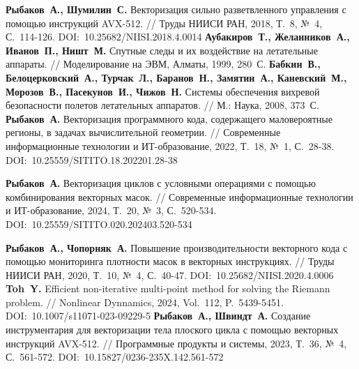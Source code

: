 \begin{thebibliography}{99}
\textbf{Рыбаков~А., Шумилин~С.} Векторизация сильно разветвленного управления с помощью инструкций AVX-512. // Труды НИИСИ РАН, 2018, Т.~8, №~4, С.~114-126. DOI:~10.25682/NIISI.2018.4.0014
\textbf{Аубакиров~Т., Желанников~А., Иванов~П., Ништ~М.} Спутные следы и их воздействие на летательные аппараты. // Моделирование на ЭВМ, Алматы, 1999, 280~С.
\textbf{Бабкин~В., Белоцерковский~А., Турчак~Л., Баранов~Н., Замятин~А., Каневский~М., Морозов~В., Пасекунов~И., Чижов~Н.} Системы обеспечения вихревой безопасности полетов летательных аппаратов. // М.: Наука, 2008, 373~С.
\textbf{Рыбаков~А.} Векторизация программного кода, содержащего маловероятные регионы, в задачах вычислительной геометрии. // Современные информационные технологии и ИТ-образование, 2022, Т.~18, №~1, С.~28-38. DOI:~10.25559/SITITO.18.202201.28-38

\textbf{Рыбаков~А.} Векторизация циклов с условными операциями с помощью комбинирования векторных масок. // Современные информационные технологии и ИТ-образование, 2024, Т.~20, №~3, С.~520-534. DOI:~10.25559/SITITO.020.202403.520-534

\textbf{Рыбаков~А., Чопорняк~А.} Повышение производительности векторного кода с помощью мониторинга плотности масок в векторных инструкциях. // Труды НИИСИ РАН, 2020, Т.~10, №~4, С.~40-47. DOI:~10.25682/NIISI.2020.4.0006
\textbf{Toh~Y.} Efficient non-iterative multi-point method for solving the Riemann problem. // Nonlinear Dynnamics, 2024, Vol.~112, P.~5439-5451. DOI:~10.1007/s11071-023-09229-5
\textbf{Рыбаков~А., Швиндт~А.} Создание инструментария для векторизации тела плоского цикла с помощью векторных инструкций AVX-512. // Программные продукты и системы, 2023, Т.~36, №~4, С.~561-572. DOI:~10.15827/0236-235X.142.561-572


\end{thebibliography}
